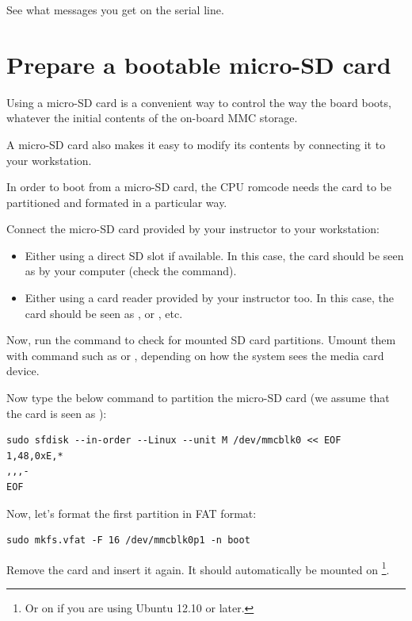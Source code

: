 See what messages you get on the serial line.

\section{Prepare a bootable micro-SD card}

Using a micro-SD card is a convenient way to control the way
the board boots, whatever the initial contents of the on-board MMC
storage.

A micro-SD card also makes it easy to modify its contents by connecting
it to your workstation.

In order to boot from a micro-SD card, the CPU romcode needs the card
to be partitioned and formated in a particular way.

Connect the micro-SD card provided by your instructor to your
workstation:

\begin{itemize}
\item Either using a direct SD slot if available.
      In this case, the card should be seen as  by
      your computer (check the  command).
\item Either using a card reader provided by your instructor too.
      In this case, the card should be seen as , or
      , etc.
\end{itemize}

Now, run the  command to check for mounted SD card
partitions. Umount them with command such as  or , depending on how
the system sees the media card device.

Now type the below command to partition the micro-SD card
(we assume that the card is seen as ):

\begin{verbatim}
sudo sfdisk --in-order --Linux --unit M /dev/mmcblk0 << EOF
1,48,0xE,*
,,,-
EOF
\end{verbatim}

Now, let's format the first partition in FAT format:

\begin{verbatim}
sudo mkfs.vfat -F 16 /dev/mmcblk0p1 -n boot
\end{verbatim}

Remove the card and insert it again. It should automatically be mounted
on  \footnote{Or on  if you
are using Ubuntu 12.10 or later.}.

